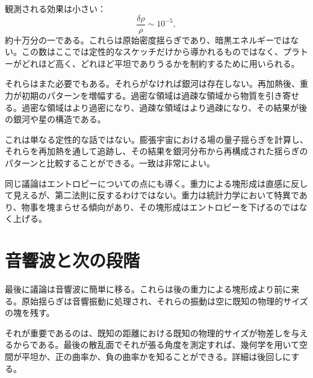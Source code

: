 観測される効果は小さい：
\begin{equation}
\frac{\delta\rho}{\rho}\sim 10^{-5},
\end{equation}
約十万分の一である。これらは原始密度揺らぎであり、暗黒エネルギーではない。この数はここでは定性的なスケッチだけから導かれるものではなく、プラトーがどれほど高く、どれほど平坦でありうるかを制約するために用いられる。

それらはまた必要でもある。それらがなければ銀河は存在しない。再加熱後、重力が初期のパターンを増幅する。過密な領域は過疎な領域から物質を引き寄せる。過密な領域はより過密になり、過疎な領域はより過疎になり、その結果が後の銀河や星の構造である。

これは単なる定性的な話ではない。膨張宇宙における場の量子揺らぎを計算し、それらを再加熱を通して追跡し、その結果を銀河分布から再構成された揺らぎのパターンと比較することができる。一致は非常によい。

同じ議論はエントロピーについての点にも導く。重力による塊形成は直感に反して見えるが、第二法則に反するわけではない。重力は統計力学において特異であり、物事を塊まらせる傾向があり、その塊形成はエントロピーを下げるのではなく上げる。

\begin{classroomqa}
\end{classroomqa}

\section{音響波と次の段階}

最後に議論は音響波に簡単に移る。これらは後の重力による塊形成より前に来る。原始揺らぎは音響振動に処理され、それらの振動は空に既知の物理的サイズの塊を残す。

それが重要であるのは、既知の距離における既知の物理的サイズが物差しを与えるからである。最後の散乱面でそれが張る角度を測定すれば、幾何学を用いて空間が平坦か、正の曲率か、負の曲率かを知ることができる。詳細は後回しにする。

\begin{classroomqa}
\end{classroomqa}